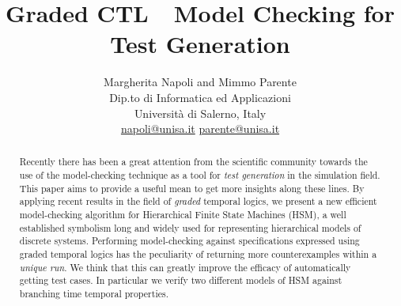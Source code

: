 \documentclass[letterpaper,twocolumn,10pt]{article}
\def    \CTL        {\mbox{\textsc{CTL }\xspace}}
\newcommand{\HSM}{HSM}
\begin{document}
\title{Graded \CTL\ Model Checking for Test Generation}
\author{
Margherita Napoli and Mimmo Parente\\
Dip.to di Informatica ed Applicazioni\\
Universit\`a di Salerno, Italy\\
\href{mailto:napoli@unisa.it}{napoli@unisa.it}
\hspace{1truecm}
\href{mailto:parente@unisa.it}{parente@unisa.it}
}

\maketitle


\begin{abstract}
\noindent
Recently there has been a great attention from the scientific community towards the use
of the model-checking technique as a tool for {\em test generation} in the simulation field.
This paper aims to provide a useful mean
to get more insights along these lines. By applying recent results
in the field of {\em graded} temporal logics, we present a new efficient model-checking algorithm
for Hierarchical Finite State Machines (\HSM), a well established symbolism long and widely
used for representing hierarchical models of discrete systems.
Performing model-checking against specifications expressed using graded temporal logics
has the peculiarity of returning more counterexamples within a {\em unique run}.
We think that this can greatly improve the efficacy
of automatically getting test cases.
In particular we ve\-ri\-fy two different models of  HSM
against branching time temporal properties.
\end{abstract}
\end{document}
